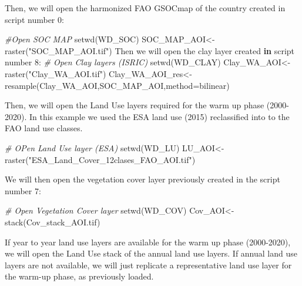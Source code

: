 \documentclass[
  10pt,
  b5paper,
]{book}
\newenvironment{Shaded}{\begin{snugshade}}{\end{snugshade}}
\newcommand{\AttributeTok}[1]{\textcolor[rgb]{0.77,0.63,0.00}{#1}}
\newcommand{\CommentTok}[1]{\textcolor[rgb]{0.56,0.35,0.01}{\textit{#1}}}
\newcommand{\ControlFlowTok}[1]{\textcolor[rgb]{0.13,0.29,0.53}{\textbf{#1}}}
\newcommand{\DecValTok}[1]{\textcolor[rgb]{0.00,0.00,0.81}{#1}}
\newcommand{\FunctionTok}[1]{\textcolor[rgb]{0.00,0.00,0.00}{#1}}
\newcommand{\NormalTok}[1]{#1}
\newcommand{\OtherTok}[1]{\textcolor[rgb]{0.56,0.35,0.01}{#1}}
\newcommand{\SpecialCharTok}[1]{\textcolor[rgb]{0.00,0.00,0.00}{#1}}
\newcommand{\StringTok}[1]{\textcolor[rgb]{0.31,0.60,0.02}{#1}}
\begin{document}
Then, we will open the harmonized FAO GSOCmap of the country created in script number 0:

\begin{Shaded}
\begin{Highlighting}[]
\CommentTok{\#Open SOC MAP }
\FunctionTok{setwd}\NormalTok{(WD\_SOC)}
\NormalTok{SOC\_MAP\_AOI}\OtherTok{\textless{}{-}}\FunctionTok{raster}\NormalTok{(}\StringTok{"SOC\_MAP\_AOI.tif"}\NormalTok{)}
\NormalTok{Then we will open the clay layer created }\ControlFlowTok{in}\NormalTok{ script number }\DecValTok{8}\SpecialCharTok{:}
 \CommentTok{\# Open Clay layers  (ISRIC)}
\FunctionTok{setwd}\NormalTok{(WD\_CLAY)}
\NormalTok{Clay\_WA\_AOI}\OtherTok{\textless{}{-}}\FunctionTok{raster}\NormalTok{(}\StringTok{"Clay\_WA\_AOI.tif"}\NormalTok{)}
\NormalTok{Clay\_WA\_AOI\_res}\OtherTok{\textless{}{-}}\FunctionTok{resample}\NormalTok{(Clay\_WA\_AOI,SOC\_MAP\_AOI,}\AttributeTok{method=}\StringTok{\textquotesingle{}bilinear\textquotesingle{}}\NormalTok{) }
\end{Highlighting}
\end{Shaded}

Then, we will open the Land Use layers required for the warm up phase (2000-2020). In this example we used the ESA land use (2015) reclassified into to the FAO land use classes.

\begin{Shaded}
\begin{Highlighting}[]
\CommentTok{\# OPen Land Use layer (ESA)}
\FunctionTok{setwd}\NormalTok{(WD\_LU)}
\NormalTok{LU\_AOI}\OtherTok{\textless{}{-}}\FunctionTok{raster}\NormalTok{(}\StringTok{"ESA\_Land\_Cover\_12clases\_FAO\_AOI.tif"}\NormalTok{)}
\end{Highlighting}
\end{Shaded}

We will then open the vegetation cover layer previously created in the script number 7:

\begin{Shaded}
\begin{Highlighting}[]
\CommentTok{\# Open Vegetation Cover layer }
\FunctionTok{setwd}\NormalTok{(WD\_COV)}
\NormalTok{Cov\_AOI}\OtherTok{\textless{}{-}}\FunctionTok{stack}\NormalTok{(}\StringTok{\textquotesingle{}Cov\_stack\_AOI.tif\textquotesingle{}}\NormalTok{)}
\end{Highlighting}
\end{Shaded}

If year to year land use layers are available for the warm up phase (2000-2020), we will open the Land Use stack of the annual land use layers. If annual land use layers are not available, we will just replicate a representative land use layer for the warm-up phase, as previously loaded.
\end{document}
